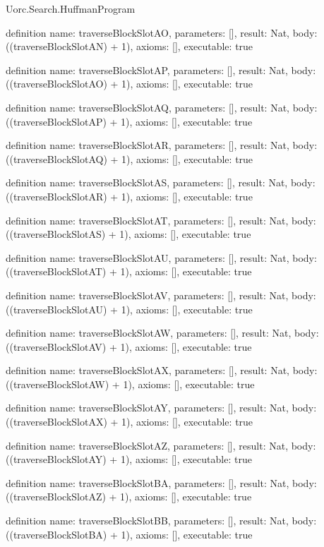 \begin{lexlean}{Uorc.Search.HuffmanProgram}
\begin{semanticmodule}
definition{
  name: traverseBlockSlotAO,
  parameters: [],
  result: Nat,
  body: ((traverseBlockSlotAN) + 1),
  axioms: [],
  executable: true
}

definition{
  name: traverseBlockSlotAP,
  parameters: [],
  result: Nat,
  body: ((traverseBlockSlotAO) + 1),
  axioms: [],
  executable: true
}

definition{
  name: traverseBlockSlotAQ,
  parameters: [],
  result: Nat,
  body: ((traverseBlockSlotAP) + 1),
  axioms: [],
  executable: true
}

definition{
  name: traverseBlockSlotAR,
  parameters: [],
  result: Nat,
  body: ((traverseBlockSlotAQ) + 1),
  axioms: [],
  executable: true
}

definition{
  name: traverseBlockSlotAS,
  parameters: [],
  result: Nat,
  body: ((traverseBlockSlotAR) + 1),
  axioms: [],
  executable: true
}

definition{
  name: traverseBlockSlotAT,
  parameters: [],
  result: Nat,
  body: ((traverseBlockSlotAS) + 1),
  axioms: [],
  executable: true
}

definition{
  name: traverseBlockSlotAU,
  parameters: [],
  result: Nat,
  body: ((traverseBlockSlotAT) + 1),
  axioms: [],
  executable: true
}

definition{
  name: traverseBlockSlotAV,
  parameters: [],
  result: Nat,
  body: ((traverseBlockSlotAU) + 1),
  axioms: [],
  executable: true
}

definition{
  name: traverseBlockSlotAW,
  parameters: [],
  result: Nat,
  body: ((traverseBlockSlotAV) + 1),
  axioms: [],
  executable: true
}

definition{
  name: traverseBlockSlotAX,
  parameters: [],
  result: Nat,
  body: ((traverseBlockSlotAW) + 1),
  axioms: [],
  executable: true
}

definition{
  name: traverseBlockSlotAY,
  parameters: [],
  result: Nat,
  body: ((traverseBlockSlotAX) + 1),
  axioms: [],
  executable: true
}

definition{
  name: traverseBlockSlotAZ,
  parameters: [],
  result: Nat,
  body: ((traverseBlockSlotAY) + 1),
  axioms: [],
  executable: true
}

definition{
  name: traverseBlockSlotBA,
  parameters: [],
  result: Nat,
  body: ((traverseBlockSlotAZ) + 1),
  axioms: [],
  executable: true
}

definition{
  name: traverseBlockSlotBB,
  parameters: [],
  result: Nat,
  body: ((traverseBlockSlotBA) + 1),
  axioms: [],
  executable: true
}


\end{semanticmodule}
\end{lexlean}
